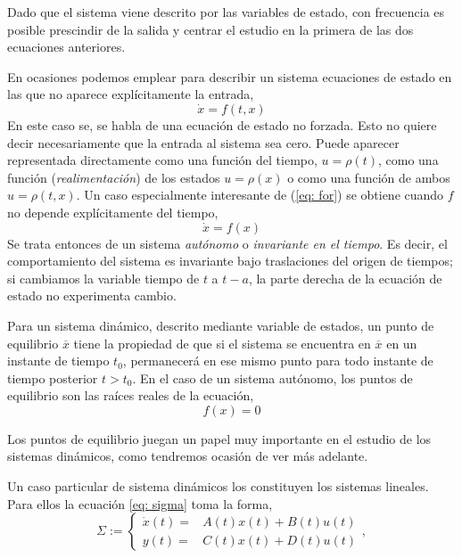 Dado que el sistema viene descrito por las variables de estado,  con frecuencia es posible prescindir de la salida y centrar el estudio en la primera de las dos ecuaciones anteriores.

 En ocasiones podemos emplear para describir un sistema ecuaciones de estado en las que no aparece explícitamente la entrada,
\begin{equation}
\dot x = f(t,x)
\end{equation}\label{eq: for}
En este caso se, se habla de una ecuación de estado no forzada. Esto no quiere decir necesariamente que la entrada al sistema sea cero. Puede aparecer representada directamente como una función del tiempo, $u=\rho(t)$,  como una función (\emph{realimentación}) de los estados $u = \rho(x)$ o como una función de ambos $u=\rho(t,x)$.
Un caso especialmente interesante de (\ref{eq: for}) se obtiene cuando $f$ no depende explícitamente del tiempo,
\begin{equation}
\dot x = f(x)
\end{equation}
Se trata entonces de un sistema \emph{autónomo} o \emph{invariante en el tiempo}. Es decir, el comportamiento del sistema es invariante bajo traslaciones del origen de tiempos; si cambiamos la variable tiempo de $t$ a $t-a$, la parte derecha de la ecuación de estado no experimenta cambio.

Para un sistema dinámico, descrito mediante variable de estados, un punto de equilibrio $\overline x$  tiene la propiedad de que si el sistema se encuentra en $\overline x$ en un instante de tiempo $t_0$, permanecerá en ese  mismo punto para todo instante de tiempo posterior $t>t_0$. En el caso de un sistema autónomo, los puntos de equilibrio son las raíces reales de la ecuación,
\begin{equation}
f(x)=0
\end{equation} 

Los puntos de equilibrio juegan un papel muy importante en el estudio de los sistemas dinámicos, como tendremos ocasión de ver más adelante.

Un caso particular de sistema dinámicos los constituyen los sistemas lineales. Para ellos la ecuación \ref{eq: sigma} toma la forma,
\begin{equation}
	\Sigma := \begin{cases}
		\dot x(t) =& A(t)x(t)+B(t)u(t) \\ y(t) =& C(t)x(t)+D(t)u(t)
	\end{cases}, 
\label{eq: sigmaL}
\end{equation}

